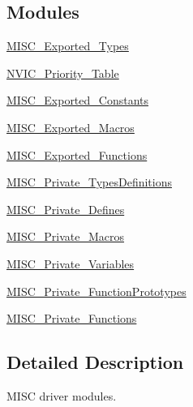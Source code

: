 \subsection*{Modules}
\begin{DoxyCompactItemize}
\item 
\hyperlink{group___m_i_s_c___exported___types}{M\+I\+S\+C\+\_\+\+Exported\+\_\+\+Types}
\item 
\hyperlink{group___n_v_i_c___priority___table}{N\+V\+I\+C\+\_\+\+Priority\+\_\+\+Table}
\item 
\hyperlink{group___m_i_s_c___exported___constants}{M\+I\+S\+C\+\_\+\+Exported\+\_\+\+Constants}
\item 
\hyperlink{group___m_i_s_c___exported___macros}{M\+I\+S\+C\+\_\+\+Exported\+\_\+\+Macros}
\item 
\hyperlink{group___m_i_s_c___exported___functions}{M\+I\+S\+C\+\_\+\+Exported\+\_\+\+Functions}
\item 
\hyperlink{group___m_i_s_c___private___types_definitions}{M\+I\+S\+C\+\_\+\+Private\+\_\+\+Types\+Definitions}
\item 
\hyperlink{group___m_i_s_c___private___defines}{M\+I\+S\+C\+\_\+\+Private\+\_\+\+Defines}
\item 
\hyperlink{group___m_i_s_c___private___macros}{M\+I\+S\+C\+\_\+\+Private\+\_\+\+Macros}
\item 
\hyperlink{group___m_i_s_c___private___variables}{M\+I\+S\+C\+\_\+\+Private\+\_\+\+Variables}
\item 
\hyperlink{group___m_i_s_c___private___function_prototypes}{M\+I\+S\+C\+\_\+\+Private\+\_\+\+Function\+Prototypes}
\item 
\hyperlink{group___m_i_s_c___private___functions}{M\+I\+S\+C\+\_\+\+Private\+\_\+\+Functions}
\end{DoxyCompactItemize}


\subsection{Detailed Description}
M\+I\+SC driver modules. 

